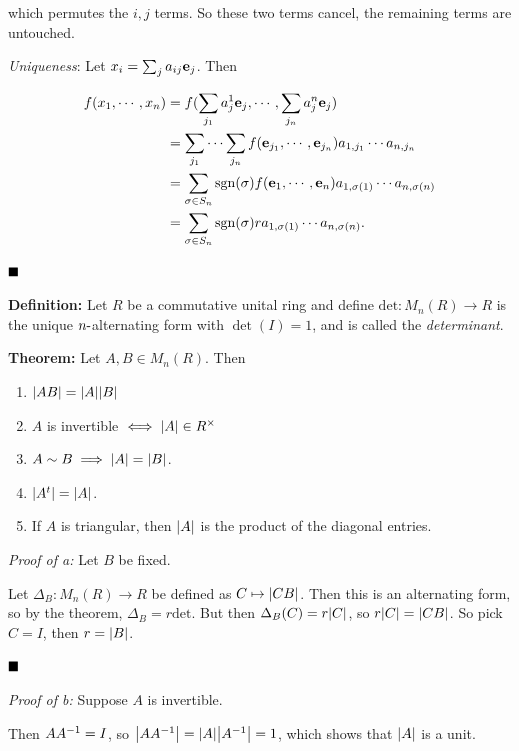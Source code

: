 which permutes the \(i,j\) terms. So these two terms cancel, the
remaining terms are untouched.

\emph{Uniqueness}: Let \(x_i = \sum_j a_{ij} \mathbf{e}_j\). Then

\begin{align*}
f(x_1, \cdots, x_n)
&= f(\sum_{j_1} a^1_j \mathbf{e}_j, \cdots, \sum_{j_n} a^n_j \mathbf{e}_j) \\
&= \sum_{j_1} \cdots \sum_{j_n} f(\mathbf{e}_{j_1}, \cdots, \mathbf{e}_{j_n} ) a_{1, j_1} \cdots a_{n, j_n} \\
&= \sum_{\sigma \in S_n} \mathrm{sgn}(\sigma) f(\mathbf{e}_1, \cdots, \mathbf{e}_n) a_{1, \sigma(1)} \cdots a_{n, \sigma(n)} \\
&= \sum_{\sigma \in S_n} \mathrm{sgn}(\sigma) r a_{1, \sigma(1)} \cdots a_{n, \sigma(n)}
.\end{align*}

\(\qed\)

\textbf{Definition:} Let \(R\) be a commutative unital ring and define
\(\mathrm{det}: M_n(R) \to R\) is the unique \(n{\hbox{-}}\)alternating form
with \(\det(I) = 1\), and is called the \emph{determinant}.

\textbf{Theorem:} Let \(A, B \in M_{n}(R)\). Then

\begin{enumerate}
\def\labelenumi{\alph{enumi}.}
\item
  \({\left\lvert {AB} \right\rvert} = {\left\lvert {A} \right\rvert} {\left\lvert {B} \right\rvert}\)
\item
  \(A\) is invertible \(\iff {\left\lvert {A} \right\rvert} \in R^{\times}\)
\item
  \(A \sim B \implies {\left\lvert {A} \right\rvert} = {\left\lvert {B} \right\rvert}\).
\item
  \({\left\lvert {A^t} \right\rvert} = {\left\lvert {A} \right\rvert}\).
\item
  If \(A\) is triangular, then \({\left\lvert {A} \right\rvert}\) is the product of the diagonal
  entries.
\end{enumerate}

\emph{Proof of a:} Let \(B\) be fixed.

Let \(\Delta_B: M_n(R) \to R\) be defined as \(C \mapsto {\left\lvert {CB} \right\rvert}\).
Then this is an alternating form, so by the theorem,
\(\Delta_B = r \mathrm{det}\). But then \(\Delta_B(C) = r{\left\lvert {C} \right\rvert}\), so
\(r{\left\lvert {C} \right\rvert} = {\left\lvert {CB} \right\rvert}\). So pick \(C = I\), then \(r = {\left\lvert {B} \right\rvert}\).

\(\qed\)

\emph{Proof of b:} Suppose \(A\) is invertible.

Then \(AA^{-1} = I\), so \({\left\lvert {AA^{-1}} \right\rvert} = {\left\lvert {A} \right\rvert}{\left\lvert {A^{-1}} \right\rvert} = 1\), which
shows that \({\left\lvert {A} \right\rvert}\) is a unit.

